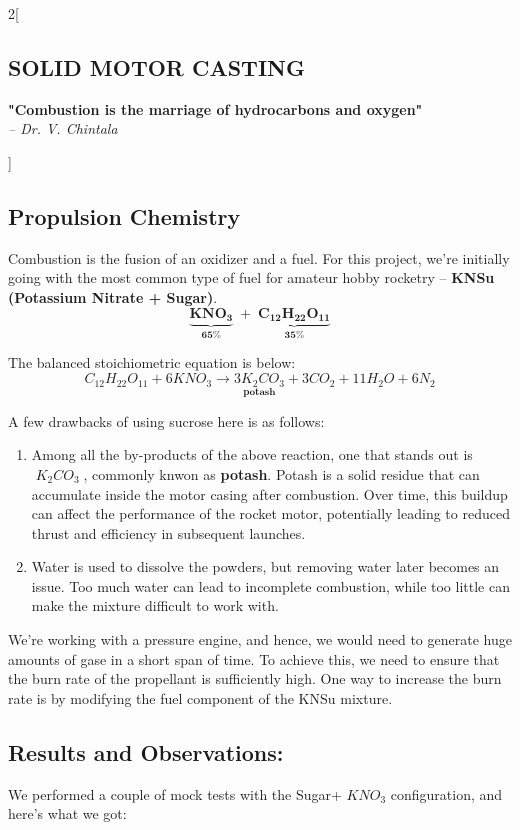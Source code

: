 \documentclass[10pt]{report}
\begin{document}
\newpage 
\begin{multicols*}{2}[
  \begin{center}
    \section*{SOLID MOTOR CASTING}
    \textbf{"Combustion is the marriage of hydrocarbons and oxygen"} \\
    \hfill  \textit{ -- Dr. V. Chintala}
  \end{center} ]
\subsection*{Propulsion Chemistry}
  Combustion is the fusion of an oxidizer and a fuel. For this project, we're initially going with the most common type of fuel for amateur hobby rocketry -- \textbf{KNSu (Potassium Nitrate + Sugar)}. 
  \[ \boldsymbol{\underbrace{KNO_3}_{65 \%} \; + \; \underbrace{C_{12} H_{22} O_{11}}_{35 \%}} \]

  \noindent The balanced stoichiometric equation is below:
  \[ C_{12}H_{22}O_{11} + 6 KNO_3 \rightarrow \underset{\textbf{potash}}{3K_2CO_3} + 3CO_2+11H_2O+6N_2 \] 

  \noindent A few drawbacks of using sucrose here is as follows:
  \begin{enumerate}
    \item Among all the by-products of the above reaction, one that stands out is $\; K_2 CO_3\;$, commonly knwon as \textbf{potash}. Potash is a solid residue that can accumulate inside the motor casing after combustion. Over time, this buildup can affect the performance of the rocket motor, potentially leading to reduced thrust and efficiency in subsequent launches. 
    \item  Water is used to dissolve the powders, but removing water later becomes an issue. Too much water can lead to incomplete combustion, while too little can make the mixture difficult to work with.
  \end{enumerate}

  We're working with a pressure engine, and hence, we would need to generate huge amounts of gase in a short span of time. To achieve this, we need to ensure that the burn rate of the propellant is sufficiently high. One way to increase the burn rate is by modifying the fuel component of the KNSu mixture. \\ 


  
    \subsection*{\small Results and Observations:}
  We performed a couple of mock tests with the Sugar+ $KNO_3$ configuration, and here's what we got: \\


\end{multicols*}
\end{document}
